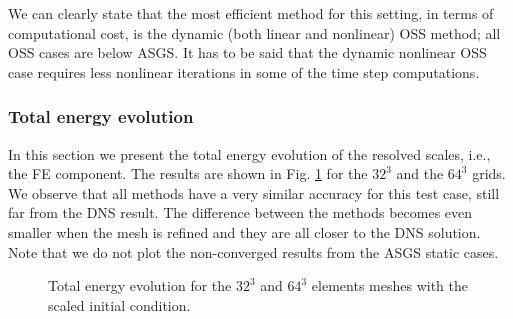 We can clearly state that the most efficient method for this setting, in terms of computational cost, is the dynamic (both linear and nonlinear) OSS method; all OSS cases are below ASGS. It has to be said that the dynamic nonlinear OSS case requires less nonlinear iterations in some of the time step computations.

\subsubsection{Total energy evolution}
\label{subsubsec-C4_Total_ene_DHIT}
In this section we present the total energy evolution of the resolved scales, i.e., the FE component. The results are shown in Fig. \ref{fig:total_ene} for the $32^3$ and the $64^3$ grids. We observe that all methods have a very similar accuracy for this test case, still far from the DNS result. The difference between the methods becomes even smaller when the mesh is refined and they are all closer to the DNS solution. Note that we do not plot the non-converged results from the ASGS static cases.


\begin{figure}[h!]
	\centering	
	\caption{Total energy evolution for the $32^3$ and $64^3$ elements meshes with the scaled initial condition.}
	\label{fig:total_ene}
\end{figure}

